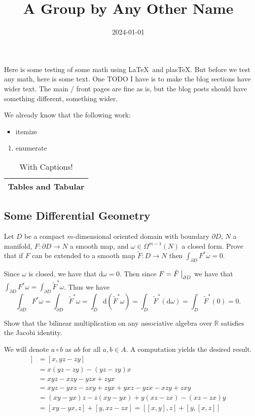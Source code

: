 \documentclass{article}
\title{A Group by Any \newline Other Name}
\date{2024-01-01}
\begin{document}
\maketitle


Here is some testing of some math using \LaTeX\ and plas\TeX.
But before we test any math, here is some text.
One TODO I have is to make the blog sections have wider text.
The main / front pages are fine as is, but the blog posts should have something different, something wider.

We already know that the following work:
\begin{itemize}
\item itemize
\end{itemize}

\begin{enumerate}
\item enumerate
\end{enumerate}

\begin{table}
  \centering
  \begin{tabular}{|c|}
    \hline
    Tables and Tabular \\
    \hline
  \end{tabular}
  \caption{With Captions!}
\end{table}

\subsection*{Some Differential Geometry}

Let $D$ be a compact $m$-dimensional oriented domain with boundary $\partial D$, $N$ a manifold, $F\colon \partial D \to N$ a smooth map, and $\omega \in \Omega^{m - 1}(N)$ a closed form.
Prove that if $F$ can be extended to a smooth map $\tilde{F}\colon D \to N$ then $\int_{\partial D} F^{*}\omega = 0$.

Since $\omega$ is closed, we have that $\text{d} \omega = 0$.
Then since $F = \tilde{F}\bigm|_{\partial D}$ we have that $\int_{\partial D} F^{*}\omega = \int_{\partial D} \tilde{F}^{*}\omega$.
Thus we have
\[
  \int_{\partial D} F^{*}\omega = \int_{\partial D} \tilde{F}^{*}\omega = \int_{D} \text{d} \left(\tilde{F}^{*}\omega\right) = \int_{D} \tilde{F}^{*}(\text{d} \omega) = \int_{D} \tilde{F}^{*}(0) = 0.
\]

Show that the bilinear multiplication on any associative algebra over $\mathbb{R}$ satisfies the Jacobi identity.

We will denote $a \circ b$ as $ab$ for all $a, b \in A$.
A computation yields the desired result.
\begin{align*}
  [x, [y, z]] &= [x, yz - zy] \\
              &= x(yz - zy) - (yz - zy)x \\
              &= xyz - xzy - yzx + zyx \\
              &= xyz - yxz - zxy + zyx + yxz - yzx - xzy + zxy \\
              &= (xy - yx)z - z(xy - yx) + y(xz - zx) - (xz - zx)y \\
              &= [xy - yx, z] + [y, xz - zx] = [[x, y], z] + [y, [x, z]]
\end{align*}
\end{document}
